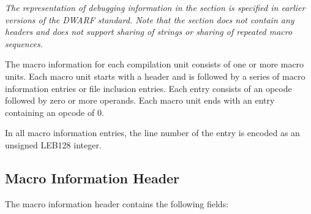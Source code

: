 \textit{The representation of debugging information in the \dotdebugmacinfo{} section is specified
in earlier versions of the DWARF standard. Note that the \dotdebugmacinfo{} section does not contain 
any headers and does not support sharing of strings or sharing of repeated macro sequences.}

The macro information for each compilation unit consists of one or
more macro units.  Each macro unit starts with a header
and is followed by a series of macro information entries or file
inclusion entries.  Each entry consists of an opcode followed by
zero or more operands. Each macro unit ends with an entry
containing an opcode of 0.

In all macro information entries,
the line number of the entry is encoded as an
unsigned LEB128 integer.

\subsection{Macro Information Header}
The macro information header contains the following fields:

